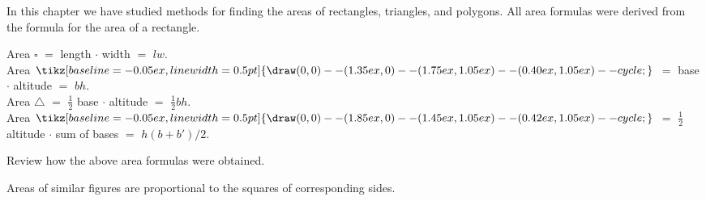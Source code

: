 \documentclass[11pt]{book}
\theoremstyle{bkplain}
\newcommand{\Xrect}{\ensuremath{\square}}
\newcommand{\Xpgram}{\mathord{\tikz[baseline=-0.05ex,line width=0.5pt]{%
  \draw (0,0) -- (1.35ex,0) -- (1.75ex,1.05ex) -- (0.40ex,1.05ex) -- cycle;}}}
\newcommand{\Xtrap}{\mathord{\tikz[baseline=-0.05ex,line width=0.5pt]{%
  \draw (0,0) -- (1.85ex,0) -- (1.45ex,1.05ex) -- (0.42ex,1.05ex) -- cycle;}}}
\theoremstyle{XIplainnote}
\theoremstyle{bkplain}
\theoremstyle{bkplain}
\begin{document}
\begin{exlist}
\item In this chapter we have studied methods for finding the areas of
  rectangles, triangles, and polygons. All area formulas were derived from the
  formula for the area of a rectangle.
  \begin{flushleft}
  Area $\Xrect$ $=$ length $\cdot$ width $=$ $lw$.\\
  Area $\Xpgram$ $=$ base $\cdot$ altitude $=$ $bh$.\\
  Area $\triangle$ $=$ $\frac{1}{2}$ base $\cdot$ altitude $=$
    $\frac{1}{2}bh$.\\
  Area $\Xtrap$ $=$ $\frac{1}{2}$ altitude $\cdot$ sum of bases $=$
    $h(b + b')/2$.
  \end{flushleft}
\item Review how the above area formulas were obtained.
\item Areas of similar figures are proportional to the squares of corresponding
  sides.
\end{exlist}
\end{document}
